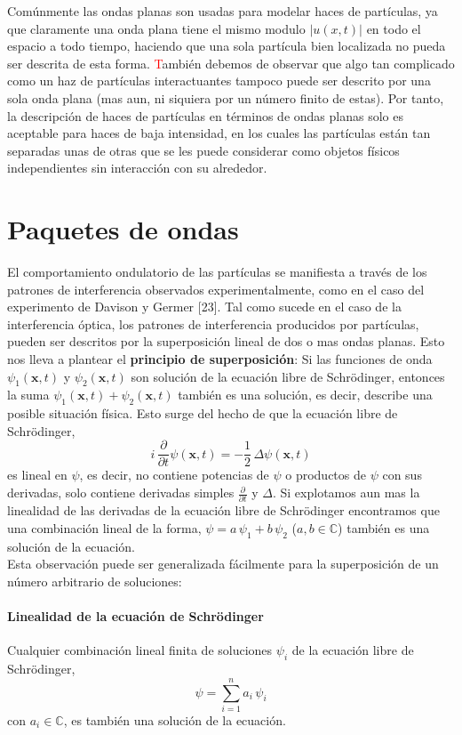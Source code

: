 \documentclass[12pt]{book}
\numberwithin{equation}{chapter}
\def\C{\mathbb{C}}
\def\x{\mathbf{x}}
\begin{document}
Com\'unmente las ondas planas son usadas para modelar haces de part\'iculas, ya que claramente una onda plana tiene el mismo modulo $|u(x,t)|$ en todo el espacio a todo tiempo, haciendo que una sola part\'icula bien localizada no pueda ser descrita de esta forma. \textcolor{red}{T}ambi\'en debemos de observar que algo tan complicado como un haz de part\'iculas interactuantes tampoco puede ser descrito por una sola onda plana (mas aun, ni siquiera por un n\'umero finito de estas). Por tanto, la descripci\'on de haces de part\'iculas en t\'erminos de ondas planas solo es aceptable para haces de baja intensidad, en los cuales las part\'iculas est\'an tan separadas unas de otras que se les puede considerar como objetos f\'isicos independientes sin interacci\'on con su alrededor.  

\section{Paquetes de ondas}
El comportamiento ondulatorio de las part\'iculas se manifiesta a trav\'es de los patrones de interferencia observados experimentalmente, como en el caso del experimento de Davison y Germer [23]. Tal como sucede en el caso de la interferencia \'optica, los patrones de interferencia producidos por part\'iculas, pueden ser descritos por la superposici\'on lineal de dos o mas ondas planas. Esto nos lleva a plantear el {\bf principio de superposici\'on}: Si las funciones de onda $\psi_{1}(\x,t)$ y $\psi_{2}(\x,t)$ son soluci\'on de la ecuaci\'on libre de Schr\"odinger, entonces la suma $\psi_{1}(\x,t) + \psi_{2}(\x,t)$ tambi\'en es una soluci\'on, es decir, describe una posible situaci\'on f\'isica. Esto surge del hecho de que la ecuaci\'on libre de Schr\"odinger,
$$ i \, \frac{\partial}{\partial t} \psi (\x , t)= -\frac{1}{2}\, \Delta \psi(\x,t) $$
es lineal en $\psi$, es decir, no contiene potencias de $\psi$ o productos de $\psi$ con sus derivadas, solo contiene derivadas simples $\frac{\partial}{\partial t}$ y $\Delta$. Si explotamos aun mas la linealidad de las derivadas de la ecuaci\'on libre de Schr\"odinger encontramos que una combinaci\'on lineal de la forma, $\psi = a\,\psi_{1} + b\, \psi_{2} $ ($a,b \in \C$) tambi\'en es una soluci\'on de la ecuaci\'on.\\
Esta observaci\'on puede ser generalizada f\'acilmente para la superposici\'on de un n\'umero arbitrario de soluciones:

\paragraph{Linealidad de la ecuaci\'on de Schr\"odinger} Cualquier combinaci\'on lineal finita de soluciones $\psi_{i}$ de la ecuaci\'on libre de Schr\"odinger,
\begin{equation}
\psi=\sum_{i=1}^{n} a_{i}\, \psi_{i}
\end{equation}
con $a_{i} \in \C$, es tambi\'en una soluci\'on de la ecuaci\'on.
\end{document}
